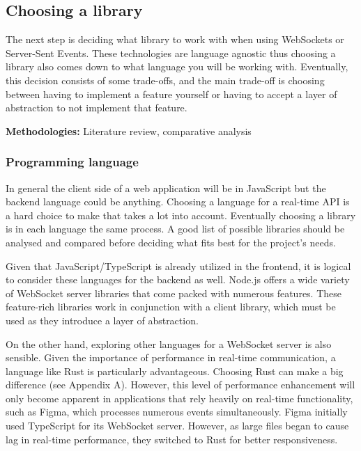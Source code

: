 \newpage

\subsection{Choosing a library}

The next step is deciding what library to work with when using WebSockets or Server-Sent Events. These technologies are language agnostic thus choosing a library also comes down to what language you will be working with. Eventually, this decision consists of some trade-offs, and the main trade-off is choosing between having to implement a feature yourself or having to accept a layer of abstraction to not implement that feature.

\textbf{Methodologies:} Literature review, comparative analysis

\subsubsection{Programming language}

In general the client side of a web application will be in JavaScript but the backend language could be anything. Choosing a language for a real-time API is a hard choice to make that takes a lot into account. Eventually choosing a library is in each language the same process. A good list of possible libraries should be analysed and compared before deciding what fits best for the project's needs.

Given that JavaScript/TypeScript is already utilized in the frontend, it is logical to consider these languages for the backend as well. Node.js offers a wide variety of WebSocket server libraries that come packed with numerous features. These feature-rich libraries work in conjunction with a client library, which must be used as they introduce a layer of abstraction.

On the other hand, exploring other languages for a WebSocket server is also sensible. Given the importance of performance in real-time communication, a language like Rust is particularly advantageous. Choosing Rust can make a big difference (see Appendix A). However, this level of performance enhancement will only become apparent in applications that rely heavily on real-time functionality, such as Figma, which processes numerous events simultaneously. Figma initially used TypeScript for its WebSocket server. However, as large files began to cause lag in real-time performance, they switched to Rust for better responsiveness.

